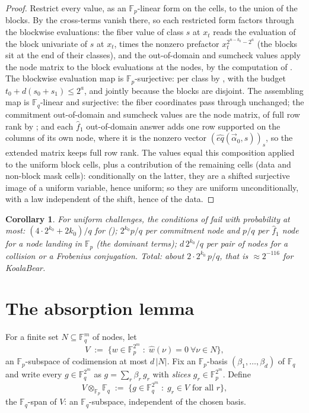 \documentclass{article}
\newcommand{\Fp}{\mathbb{F}_p}
\newcommand{\Fq}{\mathbb{F}_q}
\newcommand{\extdeg}{d}
\newtheorem{corollary}{Corollary}
\theoremstyle{definition}
\begin{document}
\begin{proof}
Restrict every value, as an $\Fp$-linear form on the cells, to the union of the blocks. By  the cross-terms vanish there, so each restricted form factors through the blockwise evaluations: the fiber value of class $s$ at $x_t$ reads the evaluation of the block univariate of $s$ at $x_t$, times the nonzero prefactor $x_t^{2^{n - k_0} - 2^a}$ (the blocks sit at the end of their classes), and the out-of-domain and sumcheck values apply the node matrix to the block evaluations at the nodes, by the computation of . The blockwise evaluation map is $\Fp$-surjective: per class by , with the budget $t_0 + \extdeg(s_0 + s_1) \leq 2^a$, and jointly because the blocks are disjoint. The assembling map is $\Fq$-linear and surjective: the fiber coordinates pass through unchanged; the commitment out-of-domain and sumcheck values are the node matrix, of full row rank by ; and each $\hat{f}_1$ out-of-domain answer adds one row supported on the columns of its own node, where it is the nonzero vector $(\hat{eq}(\vec{\alpha}_0, s))_s$, so the extended matrix keeps full row rank. The values equal this composition applied to the uniform block cells, plus a contribution of the remaining cells (data and non-block mask cells): conditionally on the latter, they are a shifted surjective image of a uniform variable, hence uniform; so they are uniform unconditionally, with a law independent of the shift, hence of the data.
\end{proof}

\begin{corollary}\label{cor:uniformprob}
For uniform challenges, the conditions of  fail with probability at most: $(4 \cdot 2^{k_0} + 2 k_0)/q$ for  (); $2^{k_0} p/q$ per commitment node and $p/q$ per $\hat{f}_1$ node for a node landing in $\Fp$ (the dominant terms); $\extdeg\, 2^{k_0}/q$ per pair of nodes for a collision or a Frobenius conjugation. Total: about $2 \cdot 2^{k_0}\, p/q$, that is $\approx 2^{-116}$ for KoalaBear.
\end{corollary}

\section{The absorption lemma}

For a finite set $N \subseteq \Fq^{m}$ of nodes, let
\[
V \;:=\; \{ w \in \Fp^{2^{m}} \;:\; \hat{w}(\nu) = 0 \ \forall \nu \in N \} ,
\]
an $\Fp$-subspace of codimension at most $\extdeg\,|N|$. Fix an $\Fp$-basis $(\beta_1, \dots, \beta_{\extdeg})$ of $\Fq$ and write every $g \in \Fq^{2^m}$ as $g = \sum_r \beta_r\, g_r$ with \emph{slices} $g_r \in \Fp^{2^m}$. Define
\[
V \otimes_{\Fp} \Fq \;:=\; \{ g \in \Fq^{2^m} \;:\; g_r \in V \text{ for all } r \} ,
\]
the $\Fq$-span of $V$: an $\Fq$-subspace, independent of the chosen basis.
\end{document}
